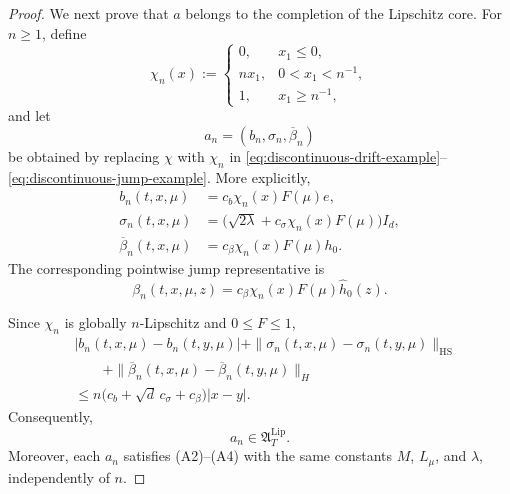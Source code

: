 \documentclass[12pt,oneside, reqno]{amsart}
\numberwithin{equation}{section}
\begin{document}
\begin{proof}
		We next prove that $a$ belongs to the completion of the
		Lipschitz core. For $n\geq1$, define
		\[
		\chi_n(x)
		:=
		\begin{cases}
			0,
			&x_1\leq0,\\[1mm]
			nx_1,
			&0<x_1<n^{-1},\\[1mm]
			1,
			&x_1\geq n^{-1},
		\end{cases}
		\]
		and let
		\[
		a_n=(b_n,\sigma_n,\overline\beta_n)
		\]
		be obtained by replacing $\chi$ with $\chi_n$ in
		\eqref{eq:discontinuous-drift-example}--
		\eqref{eq:discontinuous-jump-example}. More explicitly,
		\[
		\begin{aligned}
			b_n(t,x,\mu)
			&=
			c_b\chi_n(x)F(\mu)e,\\
			\sigma_n(t,x,\mu)
			&=
			\bigl(
			\sqrt{2\lambda}
			+c_\sigma\chi_n(x)F(\mu)
			\bigr)I_d,\\
			\overline\beta_n(t,x,\mu)
			&=
			c_\beta\chi_n(x)F(\mu)h_0.
		\end{aligned}
		\]
		The corresponding pointwise jump representative is
		\[
		\beta_n(t,x,\mu,z)
		=
		c_\beta\chi_n(x)F(\mu)\widehat h_0(z).
		\]
		
		Since $\chi_n$ is globally $n$-Lipschitz and $0\leq F\leq1$,
		\[
		\begin{aligned}
			&|b_n(t,x,\mu)-b_n(t,y,\mu)|
			+
			\|\sigma_n(t,x,\mu)-\sigma_n(t,y,\mu)\|_{\mathrm{HS}}
			\\
			&\qquad+
			\|\overline\beta_n(t,x,\mu)
			-\overline\beta_n(t,y,\mu)\|_H
			\\
			&\leq
			n\bigl(
			c_b+\sqrt d\,c_\sigma+c_\beta
			\bigr)|x-y|.
		\end{aligned}
		\]
		Consequently,
		\[
		a_n\in\mathfrak A_T^{\mathrm{Lip}}.
		\]
		Moreover, each \(a_n\) satisfies \textnormal{(A2)}--\textnormal{(A4)}
		with the same constants \(M\), \(L_\mu\), and \(\lambda\),
		independently of \(n\).
		

\end{proof}
\end{document}
